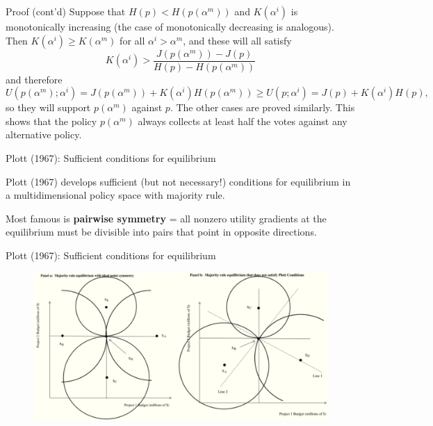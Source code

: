 \documentclass[11pt,aspectratio=169]{beamer}
\begin{document}
\begin{frame}{Proof (cont'd)}
Suppose that $H(p)<H(p(\alpha ^{m}))$ and $K(\alpha ^{i})$ is monotonically
increasing (the case of monotonically decreasing is analogous). Then $%
K(\alpha ^{i})\geq K(\alpha ^{m})$ for all $\alpha ^{i}>\alpha ^{m}$, and
these will all satisfy%
\begin{equation*}
K(\alpha ^{i})>\frac{J(p(\alpha ^{m}))-J(p)}{H(p)-H(p(\alpha ^{m}))} 
\end{equation*}%
and therefore%
\begin{equation*}
U(p(\alpha ^{m});\alpha ^{i})=J(p(\alpha ^{m}))+K(\alpha ^{i})H(p(\alpha
^{m}))\geq U(p;\alpha ^{i})=J(p)+K(\alpha ^{i})H(p), 
\end{equation*}%
so they will support $p(\alpha ^{m})$ against $p$. The other cases are
proved similarly. This shows that the policy $p(\alpha ^{m})$ always
collects at least half the votes against any alternative policy.

\end{frame}
\begin{frame}{Plott (1967): Sufficient conditions for equilibrium}

\Large

Plott (1967) develops \alert{sufficient} (but not \alert{necessary}!) conditions for equilibrium in a multidimensional policy space with majority rule.

\vspace{1em}
\pause

Most famous is \textbf{pairwise symmetry} = all nonzero utility gradients at the equilibrium must be divisible into pairs that point in opposite directions.

\end{frame}

\begin{frame}{Plott (1967): Sufficient conditions for equilibrium}

\begin{figure}
\includegraphics[width=1\textwidth]{plott.png}
\end{figure}

\end{frame}
\end{document}

